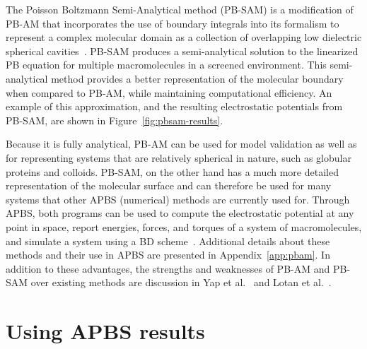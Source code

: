 \documentclass[12pt,titlepage]{article}
\newcommand{\revision}[1]{#1}
\begin{document}
The Poisson Boltzmann Semi-Analytical method (PB-SAM) is a modification of PB-AM that incorporates the use of boundary integrals into its formalism to represent a complex molecular domain as a collection of overlapping low dielectric spherical cavities~\cite{Yap2010}.
PB-SAM produces a semi-analytical solution to the linearized PB equation for multiple macromolecules in a screened environment.
This semi-analytical method provides a better representation of the molecular boundary when compared to PB-AM, while maintaining computational efficiency.
An example of this approximation, and the resulting electrostatic potentials from PB-SAM, are shown in Figure~\ref{fig:pbsam-results}.

Because it is fully analytical, PB-AM can be used for model validation as well as for representing systems that are relatively spherical in nature, such as globular proteins and colloids.
PB-SAM, on the other hand has a much more detailed representation of the molecular surface and can therefore be used for many systems that other APBS (numerical) methods are currently used for. Through APBS, both programs can be used to compute the electrostatic potential at any point in space, report energies, forces, and torques of a system of macromolecules, and simulate a system using a BD scheme~\cite{Ermak1978}.
Additional details about these methods and their use in APBS are presented in Appendix~\ref{app:pbam}.
\revision{In addition to these advantages, the strengths and weaknesses of PB-AM and PB-SAM over existing methods are discussion in Yap et al.\ \cite{Yap2010} and Lotan et al.\ \cite{Lotan2006}.}

\section{Using APBS results}
\end{document}
